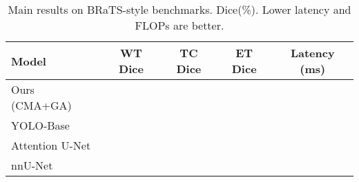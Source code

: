 \begin{table}[t]
\centering
\caption{Main results on BRaTS-style benchmarks. Dice(\%). Lower latency and FLOPs are better.}
\label{tab:main}
\begin{tabular}{lcccc}
\toprule
Model & WT Dice & TC Dice & ET Dice & Latency (ms) \\
\midrule
Ours (CMA+GA) &  &  &  &  \\
YOLO-Base &  &  &  &  \\
Attention U-Net &  &  &  &  \\
nnU-Net &  &  &  &  \\
\bottomrule
\end{tabular}
\end{table}

